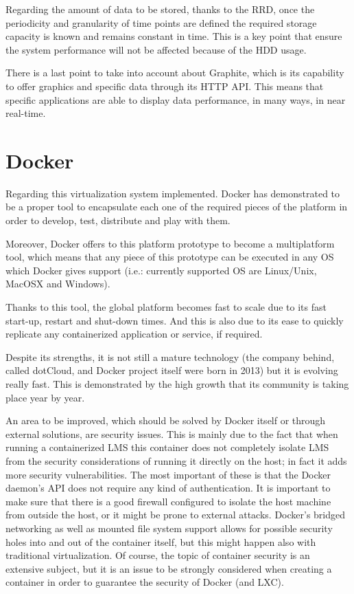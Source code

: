 Regarding the amount of data to be stored, thanks to the RRD, once the periodicity and granularity of time points are defined the required storage capacity is known and remains constant in time. This is a key point that ensure the system performance will not be affected because of the HDD usage.

There is a last point to take into account about Graphite, which is its capability to offer graphics and specific data through its HTTP API. This means that specific applications are able to display data performance, in many ways, in near real-time.

\section{Docker}

Regarding this virtualization system implemented. Docker has demonstrated to be a proper tool to encapsulate each one of the required pieces of the platform in order to develop, test, distribute and play with them.

Moreover, Docker offers to this platform prototype to become a multiplatform tool, which means that any piece of this prototype can be executed in any OS which Docker gives support (i.e.: currently supported OS are Linux/Unix, MacOSX and Windows).

Thanks to this tool, the global platform becomes fast to scale due to its fast start-up, restart and shut-down times. And this is also due to its ease to quickly replicate any containerized application or service, if required. 

Despite its strengths, it is not still a mature technology (the company behind, called dotCloud, and Docker project itself were born in 2013) but it is evolving really fast. This is demonstrated by the high growth that its community is taking place year by year. 

An area to be improved, which should be solved by Docker itself or through external solutions, are security issues. This is mainly due to the fact that when running a containerized LMS this container does not completely isolate LMS from the security considerations of running it directly on the host; in fact it adds more security vulnerabilities. The most important of these is that the Docker daemon's API does not require any kind of authentication. It is important to make sure that there is a good firewall configured to isolate the host machine from outside the host, or it might be prone to external attacks. Docker's bridged networking as well as mounted file system support allows for possible security holes into and out of the container itself, but this might happen also with traditional virtualization. Of course, the topic of container security is an extensive subject, but it is an issue to be strongly considered when creating a container in order to guarantee the security of Docker (and LXC).

